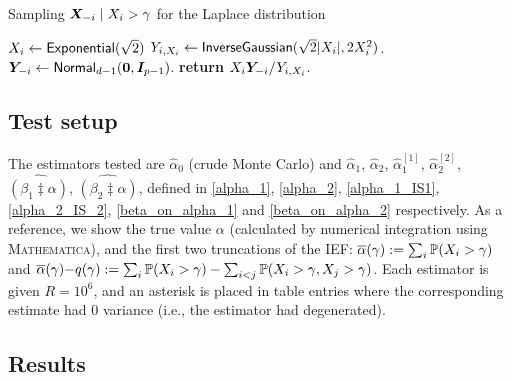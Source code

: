 \begin{algorithm}
\caption{Sampling $\bm{X}_{-i} \mid X_i > \gamma$ for the Laplace distribution}
\label{alg:cond_normals}
\begin{algorithmic}[1]
\State $X_i \gets \mathsf{Exponential}(\sqrt{2})$
\State $Y_{i,X_i} \gets \mathsf{InverseGaussian}(\sqrt{2} \lvert X_i\rvert,2 X_i^2)$.
\State $\bm{Y}_{-i} \gets \mathsf{Normal}_{d-1}(\bm{0},\bm{I}_{p-1})$.
\State \textbf{return} $X_i \bm{Y}_{-i} / Y_{i,X_i}$.
\end{algorithmic}
\end{algorithm}

\subsection{Test setup}

The estimators tested are $\hat{\alpha}_0$ (crude Monte Carlo) and
 $\hat{\alpha}_1$, $\hat{\alpha}_2$, $\hat{\alpha}_1^{[1]}$, $\hat{\alpha}_2^{[2]}$, $\widehat{(\beta_1 \ddagger \alpha)}$, $\widehat{(\beta_2 \ddagger \alpha)}$, defined in \eqref{alpha_1}, \eqref{alpha_2}, \eqref{alpha_1_IS1}, \eqref{alpha_2_IS_2}, \eqref{beta_on_alpha_1} and \eqref{beta_on_alpha_2} respectively. As a reference, we show the true value $\alpha$ (calculated by numerical integration using \textsc{Mathematica}), and the first two truncations of the IEF:
$ \overline{\alpha}(\gamma) := \sum_i \operatorname{{\mathbb P}}(X_i > \gamma)$ and $\overline{\alpha}(\gamma){-}q(\gamma) := \sum_i \operatorname{{\mathbb P}}(X_i > \gamma) - \sum_{i<j} \operatorname{{\mathbb P}}(X_i > \gamma, X_j > \gamma)$.
Each estimator is given $R=10^6$, and an asterisk is placed in table entries where the corresponding estimate had 0 variance (i.e., the estimator had degenerated).

\newpage
\subsection{Results}
\enlargethispage{1cm}

